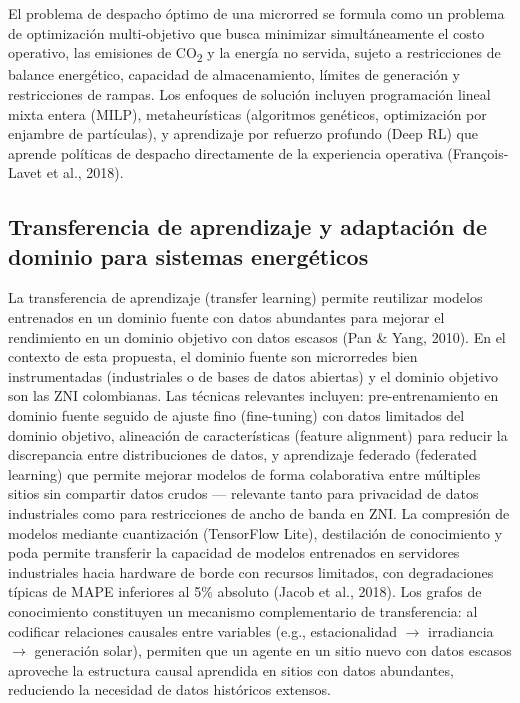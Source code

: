 \documentclass[12pt,letterpaper]{article}
\begin{document}
El problema de despacho \'optimo de una microrred se formula como un problema de optimizaci\'on multi-objetivo que busca minimizar simult\'aneamente el costo operativo, las emisiones de CO\textsubscript{2} y la energ\'ia no servida, sujeto a restricciones de balance energ\'etico, capacidad de almacenamiento, l\'imites de generaci\'on y restricciones de rampas. Los enfoques de soluci\'on incluyen programaci\'on lineal mixta entera (MILP), metaheur\'isticas (algoritmos gen\'eticos, optimizaci\'on por enjambre de part\'iculas), y aprendizaje por refuerzo profundo (Deep RL) que aprende pol\'iticas de despacho directamente de la experiencia operativa (Fran\c{c}ois-Lavet et al., 2018).

\subsection{Transferencia de aprendizaje y adaptaci\'on de dominio para sistemas energ\'eticos}

La transferencia de aprendizaje (transfer learning) permite reutilizar modelos entrenados en un dominio fuente con datos abundantes para mejorar el rendimiento en un dominio objetivo con datos escasos (Pan \& Yang, 2010). En el contexto de esta propuesta, el dominio fuente son microrredes bien instrumentadas (industriales o de bases de datos abiertas) y el dominio objetivo son las ZNI colombianas. Las t\'ecnicas relevantes incluyen: pre-entrenamiento en dominio fuente seguido de ajuste fino (fine-tuning) con datos limitados del dominio objetivo, alineaci\'on de caracter\'isticas (feature alignment) para reducir la discrepancia entre distribuciones de datos, y aprendizaje federado (federated learning) que permite mejorar modelos de forma colaborativa entre m\'ultiples sitios sin compartir datos crudos --- relevante tanto para privacidad de datos industriales como para restricciones de ancho de banda en ZNI. La compresi\'on de modelos mediante cuantizaci\'on (TensorFlow Lite), destilaci\'on de conocimiento y poda permite transferir la capacidad de modelos entrenados en servidores industriales hacia hardware de borde con recursos limitados, con degradaciones t\'ipicas de MAPE inferiores al 5\% absoluto (Jacob et al., 2018). Los grafos de conocimiento constituyen un mecanismo complementario de transferencia: al codificar relaciones causales entre variables (e.g., estacionalidad $\rightarrow$ irradiancia $\rightarrow$ generaci\'on solar), permiten que un agente en un sitio nuevo con datos escasos aproveche la estructura causal aprendida en sitios con datos abundantes, reduciendo la necesidad de datos hist\'oricos extensos.
\end{document}
